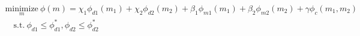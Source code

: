 \begin{equation}
\begin{split}
\underset{m}{\text{minimize}} ~ \phi(m) =
\chi_1\phi_{d1}(m_1) + \chi_2\phi_{d2}(m_2) + \beta_1\phi_{m1}(m_1) + \beta_2\phi_{m2}(m_2) + \gamma\phi_c(m_1, m_2)
\\
\quad \text{s.t.}~\phi_{d1} \leq \phi_{d1}^*, \phi_{d2} \leq \phi_{d2}^*
\end{split}
\label{eq:joint-inversion}
\end{equation}
